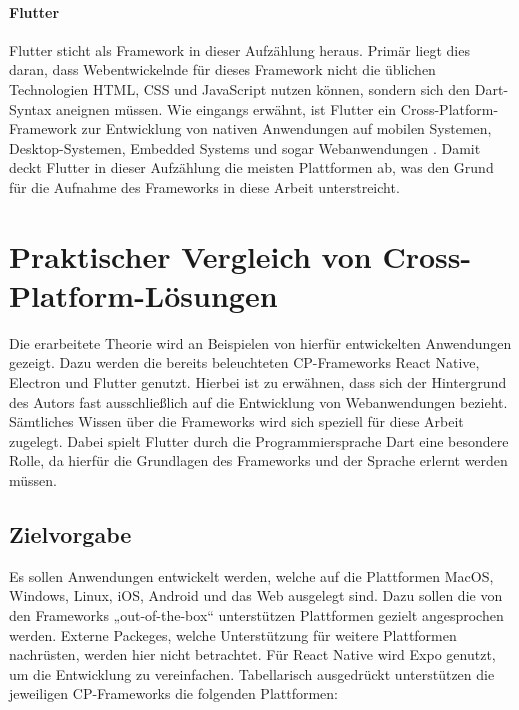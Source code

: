 \documentclass[a4paper]{scrartcl}
\begin{document}
\paragraph{Flutter}

Flutter sticht als Framework in dieser Aufzählung heraus. Primär liegt dies daran, dass Webentwickelnde für dieses Framework nicht die üblichen Technologien HTML, CSS und JavaScript nutzen können, sondern sich den Dart-Syntax aneignen müssen. Wie eingangs erwähnt, ist Flutter ein Cross-Platform-Framework zur Entwicklung von nativen Anwendungen auf mobilen Systemen, Desktop-Systemen, Embedded Systems und sogar Webanwendungen \autocite{Flutter}. Damit deckt Flutter in dieser Aufzählung die meisten Plattformen ab, was den Grund für die Aufnahme des Frameworks in diese Arbeit unterstreicht.

\newpage

\section{Praktischer Vergleich von Cross-Platform-Lösungen}

Die erarbeitete Theorie wird an Beispielen von hierfür entwickelten Anwendungen gezeigt. Dazu werden die bereits beleuchteten CP-Frameworks React Native, Electron und Flutter genutzt. Hierbei ist zu erwähnen, dass sich der Hintergrund des Autors fast ausschließlich auf die Entwicklung von Webanwendungen bezieht. Sämtliches Wissen über die Frameworks wird sich speziell für diese Arbeit zugelegt. Dabei spielt Flutter durch die Programmiersprache Dart eine besondere Rolle, da hierfür die Grundlagen des Frameworks und der Sprache erlernt werden müssen.

\subsection{Zielvorgabe}

Es sollen Anwendungen entwickelt werden, welche auf die Plattformen MacOS, Windows, Linux, iOS, Android und das Web ausgelegt sind. Dazu sollen die von den Frameworks „out-of-the-box“ unterstützen Plattformen gezielt angesprochen werden. Externe Packeges, welche Unterstützung für weitere Plattformen nachrüsten, werden hier nicht betrachtet. Für React Native wird Expo genutzt, um die Entwicklung zu vereinfachen. Tabellarisch ausgedrückt unterstützen die jeweiligen CP-Frameworks die folgenden Plattformen:
\end{document}
